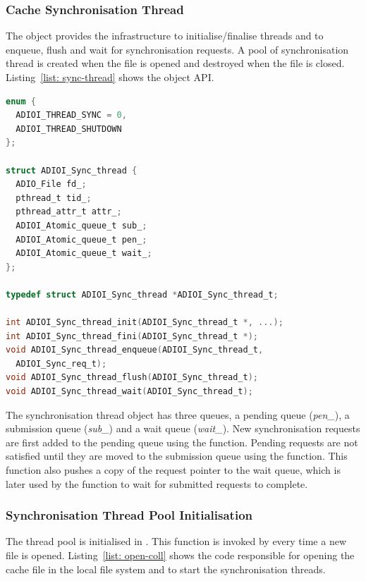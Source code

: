 \subsubsection{Cache Synchronisation Thread}
\label{subsubsec: cache-sync-thread}
The  object provides the infrastructure to initialise/finalise threads and to enqueue, flush and wait for synchronisation requests. A pool of synchronisation thread is created when the file is opened and destroyed when the file is closed. Listing~\ref{list: sync-thread} shows the object API.

\begin{lstlisting}[language=C, caption=Synchronisation Thread API, label={list: sync-thread}]
enum {
  ADIOI_THREAD_SYNC = 0,
  ADIOI_THREAD_SHUTDOWN
};

struct ADIOI_Sync_thread {
  ADIO_File fd_;
  pthread_t tid_;
  pthread_attr_t attr_;
  ADIOI_Atomic_queue_t sub_;
  ADIOI_Atomic_queue_t pen_;
  ADIOI_Atomic_queue_t wait_;
};

typedef struct ADIOI_Sync_thread *ADIOI_Sync_thread_t;

int ADIOI_Sync_thread_init(ADIOI_Sync_thread_t *, ...);
int ADIOI_Sync_thread_fini(ADIOI_Sync_thread_t *);
void ADIOI_Sync_thread_enqueue(ADIOI_Sync_thread_t, 
  ADIOI_Sync_req_t);
void ADIOI_Sync_thread_flush(ADIOI_Sync_thread_t);
void ADIOI_Sync_thread_wait(ADIOI_Sync_thread_t);
\end{lstlisting}

The synchronisation thread object has three queues, a pending queue (\textit{pen\_}), a submission queue (\textit{sub\_}) and a wait queue (\textit{wait\_}). New synchronisation requests are first added to the pending queue using the  function. Pending requests are not satisfied until they are moved to the submission queue using the  function. This function also pushes a copy of the request pointer to the wait queue, which is later used by the  function to wait for submitted requests to complete.

\subsubsection{Synchronisation Thread Pool Initialisation}
\label{subsubsec: thread-pool-init}
The thread pool is initialised in . This function is invoked by  every time a new file is opened. Listing~\ref{list: open-coll} shows the code responsible for opening the cache file in the local file system and to start the synchronisation threads.

